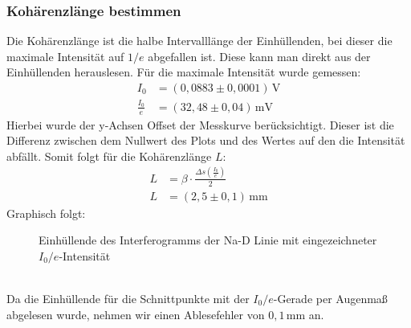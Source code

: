 \subsubsection{Kohärenzlänge bestimmen}
Die Kohärenzlänge ist die halbe Intervalllänge der Einhüllenden, bei dieser die maximale Intensität  auf $1/e$ abgefallen ist.
Diese kann man direkt aus der Einhüllenden herauslesen.
Für die maximale Intensität wurde gemessen:
\begin{align}
    I_0&=\left(0,0883\pm0,0001\right)\,\text{V}\\ %
    \frac{I_0}{e}&=\left(32,48\pm0,04\right)\,\text{mV}
\end{align}
Hierbei wurde der y-Achsen Offset der Messkurve berücksichtigt.
Dieser ist die Differenz zwischen dem Nullwert des Plots und des Wertes auf den die Intensität abfällt.
Somit folgt für die Kohärenzlänge $L$:
\begin{align}
    L&=\beta\cdot\frac{\Delta s\left(\frac{I_0}{e}\right)}{2}\\
    L&=\left(2,5\pm0,1\right)\,\text{mm}
\end{align}\newpage
Graphisch folgt:
\begin{figure}[h]
    \centering\scalebox{0.8}{}
    \caption{Einhüllende des Interferogramms der Na-D Linie mit eingezeichneter $I_0/e$-Intensität}
\end{figure}\\
Da die Einhüllende für die Schnittpunkte mit der $I_0/e$-Gerade per Augenmaß abgelesen wurde, nehmen wir einen Ablesefehler von $0,1\,\text{mm}$ an.
